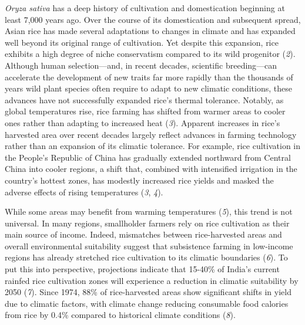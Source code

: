 \documentclass[
  letterpaper,
  DIV=11,
  numbers=noendperiod]{scrartcl}
\begin{document}
\emph{Oryza sativa} has a deep history of cultivation and domestication
beginning at least 7,000 years ago. Over the course of its domestication
and subsequent spread, Asian rice has made several adaptations to
changes in climate and has expanded well beyond its original range of
cultivation. Yet despite this expansion, rice exhibits a high degree of
niche conservatism compared to its wild progenitor (\emph{2}). Although
human selection---and, in recent decades, scientific breeding---can
accelerate the development of new traits far more rapidly than the
thousands of years wild plant species often require to adapt to new
climatic conditions, these advances have not successfully expanded
rice's thermal tolerance. Notably, as global temperatures rise, rice
farming has shifted from warmer areas to cooler ones rather than
adapting to increased heat (\emph{3}). Apparent increases in rice's
harvested area over recent decades largely reflect advances in farming
technology rather than an expansion of its climatic tolerance. For
example, rice cultivation in the People's Republic of China has
gradually extended northward from Central China into cooler regions, a
shift that, combined with intensified irrigation in the country's
hottest zones, has modestly increased rice yields and masked the adverse
effects of rising temperatures (\emph{3}, \emph{4}).

While some areas may benefit from warming temperatures (\emph{5}), this
trend is not universal. In many regions, smallholder farmers rely on
rice cultivation as their main source of income. Indeed, mismatches
between rice-harvested areas and overall environmental suitability
suggest that subsistence farming in low-income regions has already
stretched rice cultivation to its climatic boundaries (\emph{6}). To put
this into perspective, projections indicate that 15-40\% of India's
current rainfed rice cultivation zones will experience a reduction in
climatic suitability by 2050 (\emph{7}). Since 1974, 88\% of
rice-harvested areas show significant shifts in yield due to climatic
factors, with climate change reducing consumable food calories from rice
by 0.4\% compared to historical climate conditions (\emph{8}).
\end{document}
